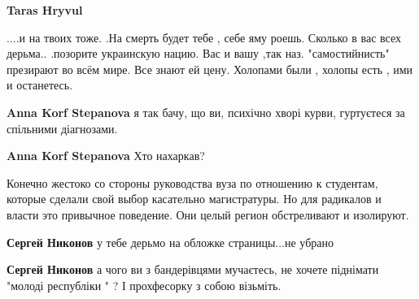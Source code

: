 \begin{itemize}
\begin{itemize}
\textbf{Taras Hryvul}

\obeycr
....и на твоих тоже.
.На смерть будет тебе , себе яму роешь.
Сколько в вас всех дерьма..
.позорите украинскую нацию.
Вас и вашу ,так наз. "самостийнисть" презирают во всём мире.
Все знают ей цену.
Холопами были , холопы есть , ими и останетесь.
\restorecr


 
\textbf{Anna Korf Stepanova} я так бачу, що ви, психічно хворі курви, гуртуєтеся за спільними діагнозами.

 
\textbf{Anna Korf Stepanova} Хто нахаркав?

\end{itemize}

 

Конечно жестоко со стороны руководства вуза по отношению к студентам, которые
сделали свой выбор касательно магистратуры. Но для радикалов и власти это
привычное поведение. Они целый регион обстреливают и изолируют.

\begin{itemize}
 
\textbf{Сергей Никонов} у тебе дерьмо на обложке страницы...не убрано

 
\textbf{Сергей Никонов} а чого ви з бандерівцями мучаєтесь, не хочете піднімати "молоді республіки " ? І прохфесорку з собою візьміть.


\end{itemize}
\end{itemize}
